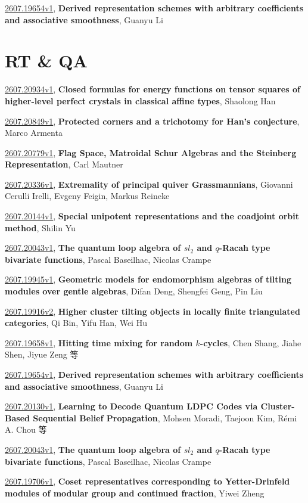 \documentclass[9pt, a4paper]{article}
\theoremstyle{plain}
\theoremstyle{definition}
\theoremstyle{remark}
\newcommand{\arxiv}[3]{\href{https://arxiv.org/abs/#1}{#1}, \textbf{\textcolor{arxivblue}{#2}}, #3}
\begin{document}
\arxiv{2607.19654v1}{Derived representation schemes with arbitrary coefficients and associative smoothness}{Guanyu Li}


\section{RT \& QA}
\arxiv{2607.20934v1}{Closed formulas for energy functions on tensor squares of higher-level perfect crystals in classical affine types}{Shaolong Han}

\arxiv{2607.20849v1}{Protected corners and a trichotomy for Han's conjecture}{Marco Armenta}

\arxiv{2607.20779v1}{Flag Space, Matroidal Schur Algebras and the Steinberg Representation}{Carl Mautner}

\arxiv{2607.20336v1}{Extremality of principal quiver Grassmannians}{Giovanni Cerulli Irelli, Evgeny Feigin, Markus Reineke}

\arxiv{2607.20144v1}{Special unipotent representations and the coadjoint orbit method}{Shilin Yu}

\arxiv{2607.20043v1}{The quantum loop algebra of $sl_2$ and $q$-Racah type bivariate functions}{Pascal Baseilhac, Nicolas Crampe}

\arxiv{2607.19945v1}{Geometric models for endomorphism algebras of tilting modules over gentle algebras}{Difan Deng, Shengfei Geng, Pin Liu}

\arxiv{2607.19916v2}{Higher cluster tilting objects in locally finite triangulated categories}{Qi Bin, Yifu Han, Wei Hu}

\arxiv{2607.19658v1}{Hitting time mixing for random $k$-cycles}{Chen Shang, Jiahe Shen, Jiyue Zeng 等}

\arxiv{2607.19654v1}{Derived representation schemes with arbitrary coefficients and associative smoothness}{Guanyu Li}

\arxiv{2607.20130v1}{Learning to Decode Quantum LDPC Codes via Cluster-Based Sequential Belief Propagation}{Mohsen Moradi, Taejoon Kim, Rémi A. Chou 等}

\arxiv{2607.20043v1}{The quantum loop algebra of $sl_2$ and $q$-Racah type bivariate functions}{Pascal Baseilhac, Nicolas Crampe}

\arxiv{2607.19706v1}{Coset representatives corresponding to Yetter-Drinfeld modules of modular group and continued fraction}{Yiwei Zheng}

\end{document}
